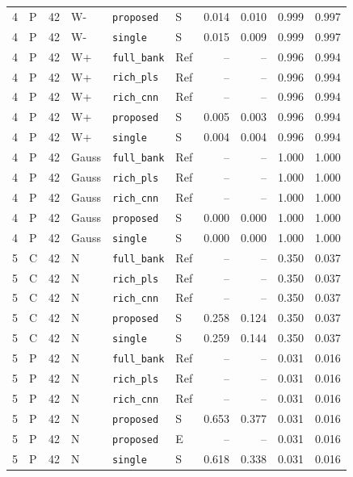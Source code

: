 \documentclass[10pt,a4paper]{article}
\begin{document}
\begin{landscape}
\begin{longtable}{rlrlllrrrr}
4 & P & 42 & W- & \texttt{proposed} & S & 0.014 & 0.010 & 0.999 & 0.997 \\
4 & P & 42 & W- & \texttt{single} & S & 0.015 & 0.009 & 0.999 & 0.997 \\
4 & P & 42 & W+ & \texttt{full\_bank} & Ref & -- & -- & 0.996 & 0.994 \\
4 & P & 42 & W+ & \texttt{rich\_pls} & Ref & -- & -- & 0.996 & 0.994 \\
4 & P & 42 & W+ & \texttt{rich\_cnn} & Ref & -- & -- & 0.996 & 0.994 \\
4 & P & 42 & W+ & \texttt{proposed} & S & 0.005 & 0.003 & 0.996 & 0.994 \\
4 & P & 42 & W+ & \texttt{single} & S & 0.004 & 0.004 & 0.996 & 0.994 \\
4 & P & 42 & Gauss & \texttt{full\_bank} & Ref & -- & -- & 1.000 & 1.000 \\
4 & P & 42 & Gauss & \texttt{rich\_pls} & Ref & -- & -- & 1.000 & 1.000 \\
4 & P & 42 & Gauss & \texttt{rich\_cnn} & Ref & -- & -- & 1.000 & 1.000 \\
4 & P & 42 & Gauss & \texttt{proposed} & S & 0.000 & 0.000 & 1.000 & 1.000 \\
4 & P & 42 & Gauss & \texttt{single} & S & 0.000 & 0.000 & 1.000 & 1.000 \\
5 & C & 42 & N & \texttt{full\_bank} & Ref & -- & -- & 0.350 & 0.037 \\
5 & C & 42 & N & \texttt{rich\_pls} & Ref & -- & -- & 0.350 & 0.037 \\
5 & C & 42 & N & \texttt{rich\_cnn} & Ref & -- & -- & 0.350 & 0.037 \\
5 & C & 42 & N & \texttt{proposed} & S & 0.258 & 0.124 & 0.350 & 0.037 \\
5 & C & 42 & N & \texttt{single} & S & 0.259 & 0.144 & 0.350 & 0.037 \\
5 & P & 42 & N & \texttt{full\_bank} & Ref & -- & -- & 0.031 & 0.016 \\
5 & P & 42 & N & \texttt{rich\_pls} & Ref & -- & -- & 0.031 & 0.016 \\
5 & P & 42 & N & \texttt{rich\_cnn} & Ref & -- & -- & 0.031 & 0.016 \\
5 & P & 42 & N & \texttt{proposed} & S & 0.653 & 0.377 & 0.031 & 0.016 \\
5 & P & 42 & N & \texttt{proposed} & E & -- & -- & 0.031 & 0.016 \\
5 & P & 42 & N & \texttt{single} & S & 0.618 & 0.338 & 0.031 & 0.016 \\

\end{longtable}
\end{landscape}
\end{document}
